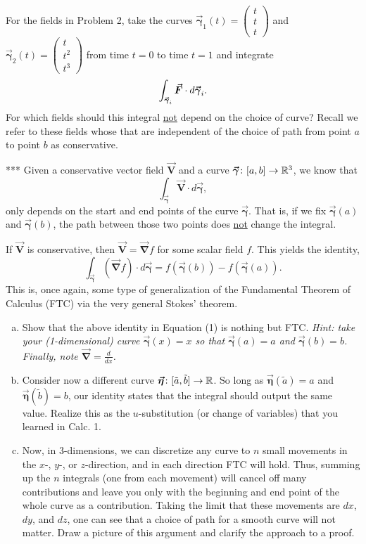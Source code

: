 \documentclass[12pt]{article} %
\newcommand{\vecfieldV}{\boldsymbol{\vec{V}}}
\newcommand{\curvegamma}{\boldsymbol{\vec{\gamma}}}
\newcommand{\grad}{\boldsymbol{\vec{\nabla}}}
\newcommand{\curveeta}{\boldsymbol{\vec{\eta}}}
\begin{document}
\begin{problem}
    For the fields in Problem 2, take the curves $\curvegamma_1(t) =\begin{pmatrix} t \\ t \\ t\end{pmatrix}$ and $\curvegamma_2(t)=\begin{pmatrix} t \\ t^2 \\ t^3 \end{pmatrix}$ from time $t=0$ to time $t=1$ and integrate
    \[
    \int_{\curvegamma_i} \forcevec \cdot d\curvegamma_i.
    \]
    For which fields should this integral \underline{not} depend on the choice of curve? Recall we refer to these fields whose that are independent of the choice of path from point $a$ to point $b$ as conservative.
\end{problem}

\begin{problem} ***
    Given a conservative vector field $\vecfieldV$ and a curve $\curvegamma \colon [a,b]\to \R^3$, we know that 
    \[
    \int_{\curvegamma} \vecfieldV\cdot d\curvegamma,
    \]
    only depends on the start and end points of the curve $\curvegamma$.  That is, if we fix $\curvegamma(a)$ and $\curvegamma(b)$, the path between those two points does \underline{not} change the integral.
    
    If $\vecfieldV$ is conservative, then $\vecfieldV = \grad f$ for some scalar field $f$.  This yields the identity,
    \begin{equation}
    \int_{\curvegamma} \left(\grad f\right) \cdot d\curvegamma = f(\curvegamma(b))-f(\curvegamma(a)).
    \end{equation}
    This is, once again, some type of generalization of the Fundamental Theorem of Calculus (FTC) via the very general Stokes' theorem.
    \begin{enumerate}[(a)]
        \item Show that the above identity in Equation (1) is nothing but FTC.  \emph{Hint: take your (1-dimensional) curve $\curvegamma(x)=x$ so that $\curvegamma(a)=a$ and $\curvegamma(b)=b$. Finally, note $\grad = \frac{d}{dx}$.}
        \item Consider now a different curve $\curveeta \colon [\tilde{a},\tilde{b}]\to \R$. So long as $\curveeta(\tilde{a})=a$ and $\curveeta(\tilde{b})=b$, our identity states that the integral should output the same value.  Realize this as the $u$-substitution (or change of variables) that you learned in Calc. 1.
        \item Now, in 3-dimensions, we can discretize any curve to $n$ small movements in the $x$-, $y$-, or $z$-direction, and in each direction FTC will hold.  Thus, summing up the $n$ integrals (one from each movement) will cancel off many contributions and leave you only with the beginning and end point of the whole curve as a contribution.  Taking the limit that these movements are $dx$, $dy$, and $dz$, one can see that a choice of path for a smooth curve will not matter.  Draw a picture of this argument and clarify the approach to a proof.
    \end{enumerate}
\end{problem}
\end{document}
